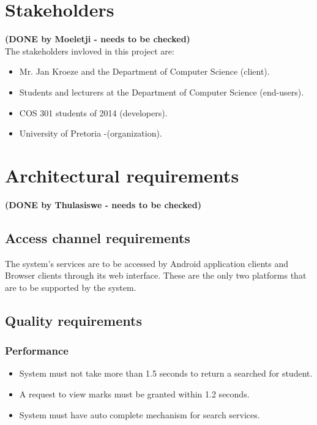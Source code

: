 \documentclass[11pt,a4paper]{article}
\begin{document}
\section{Stakeholders}
\textbf{(DONE by Moeletji - needs to be checked)}\\
The stakeholders invloved in this project are: 
\begin{itemize}
\item Mr. Jan Kroeze and the Department of Computer Science (client). 
\item Students and lecturers at the Department of Computer Science (end-users).
\item COS 301 students of 2014 (developers).
\item University of Pretoria -(organization). 
\end{itemize}

\section{Architectural requirements}
\textbf{(DONE by Thulasiswe - needs to be checked)}\\

\subsection{Access channel requirements}
The system's services are to be accessed by Android application clients and Browser clients through its web interface. These are the only two platforms that are to be supported by the system.

\subsection{Quality requirements}
\subsubsection{Performance}
	\begin{itemize}
		\item System must not take more than 1.5 seconds to return a searched for student.
		\item A request to view marks must be granted within 1.2 seconds.
		\item System must have auto complete mechanism for search services.
	\end{itemize}
\end{document}
